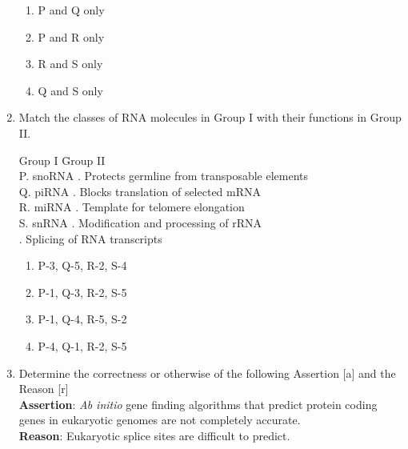 \documentclass[journal,12pt,onecolumn]{IEEEtran}
\theoremstyle{remark}
\begin{document}
\begin{enumerate}
    \begin{enumerate}
        \item P and Q only
        \item P and R only
        \item R and S only
        \item Q and S only
    \end{enumerate}
    

    \item Match the classes of RNA molecules in Group I with their functions in Group II.

    \begin{tabbing}
    Group I \hspace{2cm} \= Group II \\
    P. snoRNA    . Protects germline from transposable elements \\
    Q. piRNA     . Blocks translation of selected mRNA \\
    R. miRNA     . Template for telomere elongation \\
    S. snRNA     . Modification and processing of rRNA \\
                  . Splicing of RNA transcripts
    \end{tabbing}
    \vspace{-0.8em}
    \begin{multicols}{2}
    \begin{enumerate}
        \item P-3, Q-5, R-2, S-4
        \item P-1, Q-3, R-2, S-5
        \item P-1, Q-4, R-5, S-2
        \item P-4, Q-1, R-2, S-5
    \end{enumerate}
    \end{multicols}

    \item Determine the correctness or otherwise of the following Assertion [a] and the Reason [r]\\
    \textbf{Assertion}: \textit{Ab initio} gene finding algorithms that predict protein coding genes in eukaryotic genomes are not completely accurate.\\
    \textbf{Reason}: Eukaryotic splice sites are difficult to predict.
    

\end{enumerate}
\end{document}
